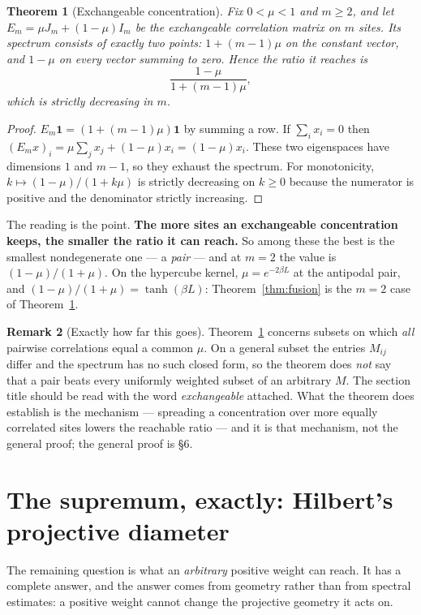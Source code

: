 \documentclass[11pt,a4paper]{article}
\theoremstyle{plain}
\newtheorem{theorem}{Theorem}[section]
\theoremstyle{definition}
\newtheorem{remark}[theorem]{Remark}
\begin{document}
\begin{theorem}[Exchangeable concentration]\label{thm:exch}
Fix $0<\mu<1$ and $m\ge2$, and let $E_m=\mu J_m+(1-\mu)I_m$ be the exchangeable
correlation matrix on $m$ sites. Its spectrum consists of exactly two points: $1+(m-1)\mu$ on
the constant vector, and $1-\mu$ on every vector summing to zero. Hence the ratio
it reaches is
\[
  \frac{1-\mu}{1+(m-1)\mu},
\]
which is \emph{strictly decreasing} in $m$.
\end{theorem}

\begin{proof}
$E_m\mathbf 1 = (1+(m-1)\mu)\mathbf 1$ by summing a row. If $\sum_i x_i=0$ then
$(E_mx)_i=\mu\sum_j x_j+(1-\mu)x_i=(1-\mu)x_i$. These two eigenspaces have
dimensions $1$ and $m-1$, so they exhaust the spectrum. For monotonicity,
$k\mapsto (1-\mu)/(1+k\mu)$ is strictly decreasing on $k\ge 0$ because the
numerator is positive and the denominator strictly increasing.
\end{proof}

The reading is the point. \textbf{The more sites an exchangeable concentration
keeps, the smaller the ratio it can reach.} So among these the best is the
smallest nondegenerate one --- a \emph{pair} --- and at $m=2$ the value is
$(1-\mu)/(1+\mu)$. On the hypercube kernel, $\mu=e^{-2\beta L}$ at the antipodal
pair, and $(1-\mu)/(1+\mu)=\tanh(\beta L)$: Theorem~\ref{thm:fusion} is the
$m=2$ case of Theorem~\ref{thm:exch}.

\begin{remark}[Exactly how far this goes]\label{rem:exchscope}
Theorem~\ref{thm:exch} concerns subsets on which \emph{all} pairwise
correlations equal a common $\mu$. On a general subset the entries $M_{ij}$
differ and the spectrum has no such closed form, so the theorem does \emph{not}
say that a pair beats every uniformly weighted subset of an arbitrary $M$. The
section title should be read with the word \emph{exchangeable} attached. What
the theorem does establish is the mechanism --- spreading a concentration over
more equally correlated sites lowers the reachable ratio --- and it is that
mechanism, not the general proof; the general proof is \S6.
\end{remark}

\section{The supremum, exactly: Hilbert's projective diameter}

The remaining question is what an \emph{arbitrary} positive weight can reach.
It has a complete answer, and the answer comes from geometry rather than from
spectral estimates: a positive weight cannot change the projective geometry it
acts on.
\end{document}
